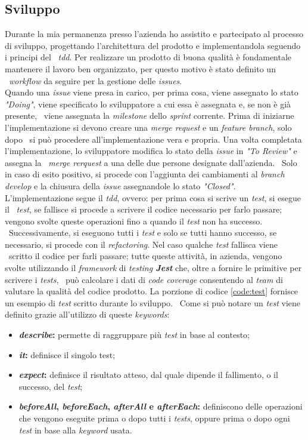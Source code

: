 \subsection{Sviluppo}
Durante la mia permanenza presso l'azienda ho assistito e partecipato al processo di sviluppo, progettando l'architettura del prodotto e implementandola seguendo i principi del \
\emph{\acrfull{tdd}}. Per realizzare un prodotto di buona qualità è fondamentale mantenere il lavoro ben organizzato, per questo motivo è stato definito un \
\emph{workflow} da seguire per la gestione delle \emph{issues}. \\

Quando una \emph{issue} viene presa in carico, per prima cosa, viene assegnato lo stato \emph{"Doing"}, viene specificato lo sviluppatore a cui essa è assegnata e, se non è già presente, \
viene assegnata la \emph{milestone} dello \emph{sprint} corrente. Prima di iniziarne l'implementazione si devono creare una \emph{merge request} e un \emph{feature branch}, solo dopo \
si può procedere all'implementazione vera e propria. Una volta completata l'implementazione, lo sviluppatore modifica lo stato della \emph{issue} in \emph{"To Review"} e assegna la \
\emph{merge rerquest} a una delle due persone designate dall'azienda. \
Solo in caso di esito positivo, si procede con l'aggiunta dei cambiamenti al \emph{branch develop} e la chiusura della \emph{issue} assegnandole lo stato \emph{"Closed"}. \\

L'implementazione segue il \emph{\acrlong{tdd}}, ovvero: per prima cosa si scrive un \emph{test}, si esegue il \
\emph{test}, se fallisce si procede a scrivere il codice necessario per farlo passare; vengono svolte queste operazioni fino a quando il \emph{test} non ha successo. \
Successivamente, si eseguono tutti i \emph{test} e solo se tutti hanno successo, se necessario, si procede con il \emph{refactoring}. Nel caso qualche \emph{test} fallisca viene \
scritto il codice per farli passare; tutte queste attività, in azienda, vengono svolte utilizzando il \emph{framework} di \emph{testing \textbf{Jest}} che, oltre a fornire le primitive per scrivere i \emph{tests}, \
può calcolare i dati di \emph{code coverage} consentendo al \emph{team} di valutare la qualità del codice prodotto. La porzione di codice \ref{code:test} fornisce un esempio di \emph{test} scritto durante lo sviluppo. \
Come si può notare un \emph{test} viene definito grazie all'utilizzo di queste \emph{keywords}:
\begin{itemize}
  \item \textbf{\emph{describe}:} permette di raggruppare più \emph{test} in base al contesto;
  \item \textbf{\emph{it}:} definisce il singolo test;
  \item \textbf{\emph{expect}:} definisce il risultato atteso, dal quale dipende il fallimento, o il successo, del \emph{test};
  \item \textbf{\emph{beforeAll}, \emph{beforeEach}, \emph{afterAll} e \emph{afterEach}:} definiscono delle operazioni che vengono eseguite prima o dopo tutti i \emph{tests}, oppure prima o dopo ogni \emph{test} in base alla \emph{keyword} usata.
\end{itemize}

